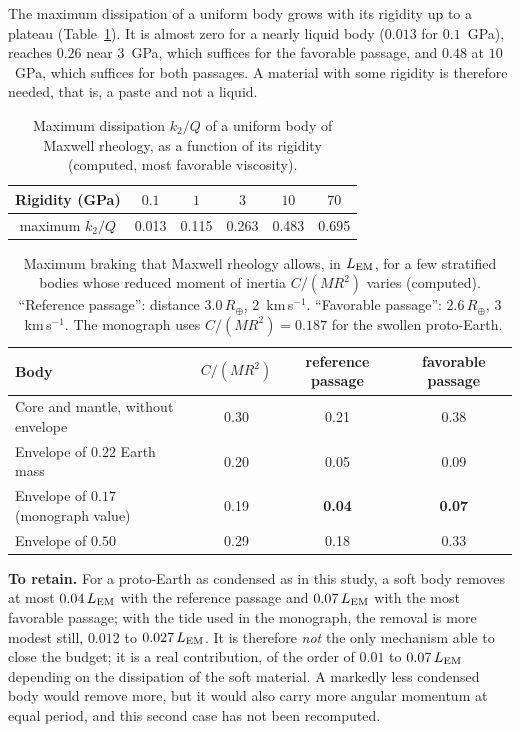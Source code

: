 \documentclass[11pt,a4paper]{article}
\newcommand{\Rt}{\ensuremath{R_\oplus}}
\newcommand{\LEM}{\ensuremath{L_{\rm EM}}}
\begin{document}
The maximum dissipation of a uniform body grows with its rigidity up to a plateau (Table~\ref{tab:rigidite}). It is almost zero for a nearly liquid body ($0.013$ for $0.1$~GPa), reaches $0.26$ near $3$~GPa, which suffices for the favorable passage, and $0.48$ at $10$~GPa, which suffices for both passages. A material with some rigidity is therefore needed, that is, a paste and not a liquid.

\begin{table}[htbp]
\centering
\caption{Maximum dissipation $k_2/Q$ of a uniform body of Maxwell rheology, as a function of its rigidity (computed, most favorable viscosity).\label{tab:rigidite}}
\small
\begin{tabular}{cccccc}
\toprule
Rigidity (GPa) & $0.1$ & $1$ & $3$ & $10$ & $70$ \\
\midrule
maximum $k_2/Q$ & 0.013 & 0.115 & 0.263 & 0.483 & 0.695 \\
\bottomrule
\end{tabular}
\end{table}

\begin{table}[htbp]
\centering
\caption{Maximum braking that Maxwell rheology allows, in $\LEM$, for a few stratified bodies whose reduced moment of inertia $C/(MR^2)$ varies (computed). ``Reference passage'': distance $3.0\,\Rt$, $2$~km\,s$^{-1}$. ``Favorable passage'': $2.6\,\Rt$, $3$~km\,s$^{-1}$. The monograph uses $C/(MR^2)=0.187$ for the swollen proto-Earth.\label{tab:interieur}}
\small
\begin{tabular}{lccc}
\toprule
Body & $C/(MR^2)$ & reference passage & favorable passage \\
\midrule
Core and mantle, without envelope & 0.30 & 0.21 & 0.38 \\
Envelope of $0.22$ Earth mass & 0.20 & 0.05 & 0.09 \\
Envelope of $0.17$ (monograph value) & 0.19 & \textbf{0.04} & \textbf{0.07} \\
Envelope of $0.50$ & 0.29 & 0.18 & 0.33 \\
\bottomrule
\end{tabular}
\end{table}

\textbf{To retain.} For a proto-Earth as condensed as in this study, a soft body removes at most $0.04\,\LEM$ with the reference passage and $0.07\,\LEM$ with the most favorable passage; with the tide used in the monograph, the removal is more modest still, $0.012$ to $0.027\,\LEM$. It is therefore \emph{not} the only mechanism able to close the budget; it is a real contribution, of the order of $0.01$ to $0.07\,\LEM$ depending on the dissipation of the soft material. A markedly less condensed body would remove more, but it would also carry more angular momentum at equal period, and this second case has not been recomputed.
\end{document}
